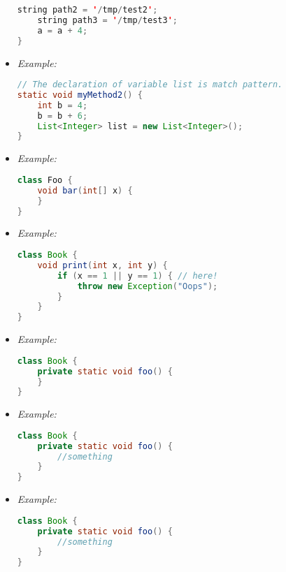\begin{itemize}
\begin{lstlisting}[language=Java]
	string path2 = '/tmp/test2';
	string path3 = '/tmp/test3';
	a = a + 4;
}
\end{lstlisting}

	\item {}
{\it Example:}
\begin{lstlisting}[language=Java]
// The declaration of variable list is match pattern.
static void myMethod2() { 
	int b = 4;
	b = b + 6;
	List<Integer> list = new List<Integer>();
}
\end{lstlisting}

	\item {}
{\it Example:}
\begin{lstlisting}[language=Java]
class Foo {
	void bar(int[] x) {
	}
}
\end{lstlisting}

	\item {}
{\it Example:}
\begin{lstlisting}[language=Java]
class Book {
	void print(int x, int y) {
		if (x == 1 || y == 1) { // here!
			throw new Exception("Oops");
		}
	}
}
\end{lstlisting}

	\item {}
{\it Example:}
\begin{lstlisting}[language=Java]
class Book {
	private static void foo() {
	}
}
\end{lstlisting}

	\item {}
{\it Example:}
\begin{lstlisting}[language=Java]
class Book {
	private static void foo() {
		//something
	}
}
\end{lstlisting}

	\item {}
{\it Example:}
\begin{lstlisting}[language=Java]
class Book {
	private static void foo() {
		//something
	}
}
\end{lstlisting}


\end{itemize}

